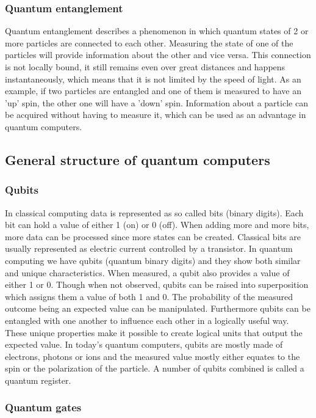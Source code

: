\subsubsection{Quantum entanglement}
Quantum entanglement describes a phenomenon in which quantum states of 2 or more particles are connected to each other. Measuring the state of one of the particles will provide information about the other and vice versa. This connection is not locally bound, it still remains even over great distances and happens instantaneously, which means that it is not limited by the speed of light. As an example, if two particles are entangled and one of them is measured to have an 'up' spin, the other one will have a 'down' spin. Information about a particle can be acquired without having to measure it, which can be used as an advantage in quantum computers.
\newpage
\subsection{General structure of quantum computers}
\subsubsection{Qubits}
In classical computing data is represented as so called bits (binary digits). Each bit can hold a value of either 1 (on) or 0 (off). When adding more and more bits, more data can be processed since more states can be created. Classical bits are usually represented as electric current controlled by a transistor. In quantum computing we have qubits (quantum binary digits) and they show both similar and unique characteristics. When measured, a qubit also provides a value of either 1 or 0. Though when not observed, qubits can be raised into superposition which assigns them a value of both 1 and 0. The probability of the measured outcome being an expected value can be manipulated. Furthermore qubits can be entangled with one another to influence each other in a logically useful way. These unique properties make it possible to create logical units that output the expected value.
In today's quantum computers, qubits are mostly made of electrons, photons or ions and the measured value mostly either equates to the spin or the polarization of the particle.
A number of qubits combined is called a quantum register. 
\subsubsection{Quantum gates}

